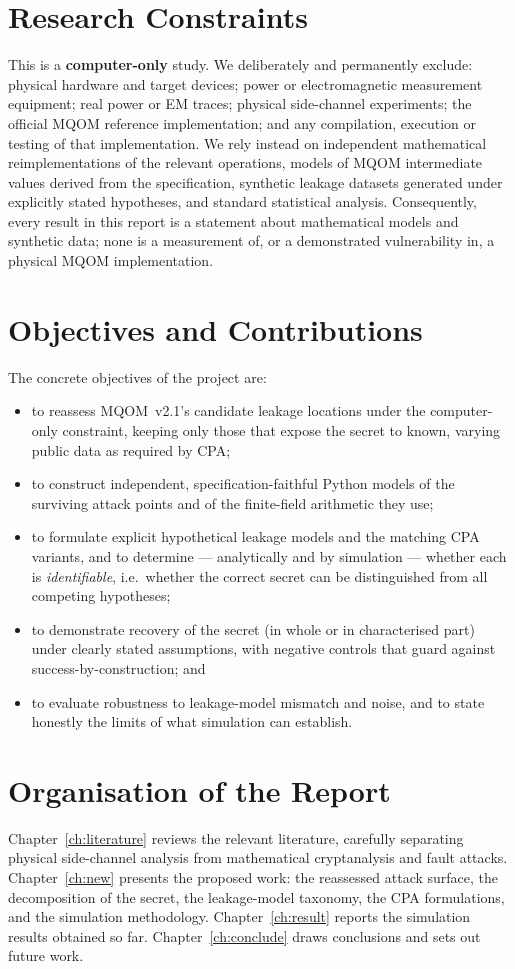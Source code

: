 \section{Research Constraints}

This is a \textbf{computer-only} study. We deliberately and permanently exclude: physical
hardware and target devices; power or electromagnetic measurement equipment; real power
or EM traces; physical side-channel experiments; the official MQOM reference
implementation; and any compilation, execution or testing of that implementation. We
rely instead on independent mathematical reimplementations of the relevant operations,
models of MQOM intermediate values derived from the specification, synthetic leakage
datasets generated under explicitly stated hypotheses, and standard statistical
analysis. Consequently, every result in this report is a statement about mathematical
models and synthetic data; none is a measurement of, or a demonstrated vulnerability in,
a physical MQOM implementation.

\section{Objectives and Contributions}

The concrete objectives of the project are:
\begin{itemize}
\item to reassess MQOM~v2.1's candidate leakage locations under the computer-only
constraint, keeping only those that expose the secret to known, varying public data as
required by CPA;
\item to construct independent, specification-faithful Python models of the surviving
attack points and of the finite-field arithmetic they use;
\item to formulate explicit hypothetical leakage models and the matching CPA variants,
and to determine --- analytically and by simulation --- whether each is
\emph{identifiable}, i.e.\ whether the correct secret can be distinguished from all
competing hypotheses;
\item to demonstrate recovery of the secret (in whole or in characterised part) under
clearly stated assumptions, with negative controls that guard against
success-by-construction; and
\item to evaluate robustness to leakage-model mismatch and noise, and to state honestly
the limits of what simulation can establish.
\end{itemize}

\section{Organisation of the Report}

Chapter~\ref{ch:literature} reviews the relevant literature, carefully separating
physical side-channel analysis from mathematical cryptanalysis and fault attacks.
Chapter~\ref{ch:new} presents the proposed work: the reassessed attack surface, the
decomposition of the secret, the leakage-model taxonomy, the CPA formulations, and the
simulation methodology. Chapter~\ref{ch:result} reports the simulation results obtained
so far. Chapter~\ref{ch:conclude} draws conclusions and sets out future work.
